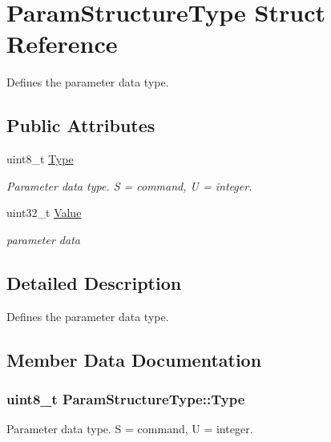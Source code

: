 \hypertarget{struct_param_structure_type}{\section{Param\-Structure\-Type Struct Reference}
\label{struct_param_structure_type}
}


Defines the parameter data type.  


\subsection*{Public Attributes}
\begin{DoxyCompactItemize}
\item 
uint8\-\_\-t \hyperlink{struct_param_structure_type_a07c3f655760942fd5b06c97ff9deea4a}{Type}
\begin{DoxyCompactList}\small\item\em Parameter data type. S = command, U = integer. \end{DoxyCompactList}\item 
uint32\-\_\-t \hyperlink{struct_param_structure_type_a6804a54620bdeec3aee9a58941fef762}{Value}
\begin{DoxyCompactList}\small\item\em parameter data \end{DoxyCompactList}\end{DoxyCompactItemize}


\subsection{Detailed Description}
Defines the parameter data type. 

\subsection{Member Data Documentation}
\hypertarget{struct_param_structure_type_a07c3f655760942fd5b06c97ff9deea4a}{
\subsubsection[{Type}]{\setlength{\rightskip}{0pt plus 5cm}uint8\-\_\-t Param\-Structure\-Type\-::\-Type}}\label{struct_param_structure_type_a07c3f655760942fd5b06c97ff9deea4a}


Parameter data type. S = command, U = integer. 

